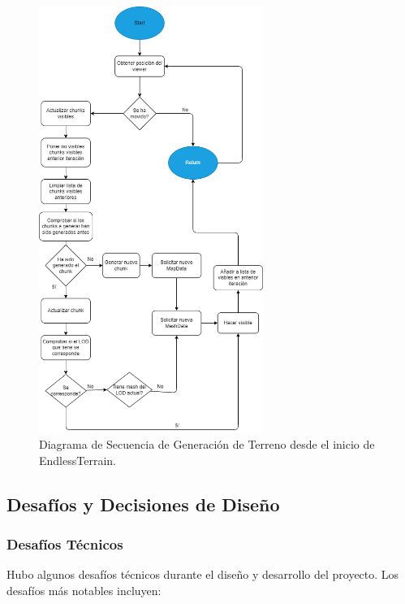 \begin{figure}[H]
    \centering
    \includegraphics[width=0.65\textwidth]{img/FlowDiagramEndlessTerrain.png}
    \caption{Diagrama de Secuencia de Generación de Terreno desde el inicio de EndlessTerrain.}
\end{figure}
\newpage

\subsection{Desafíos y Decisiones de Diseño}

\subsubsection{Desafíos Técnicos}
Hubo algunos desafíos técnicos durante el diseño y desarrollo del proyecto. Los desafíos más notables incluyen:

